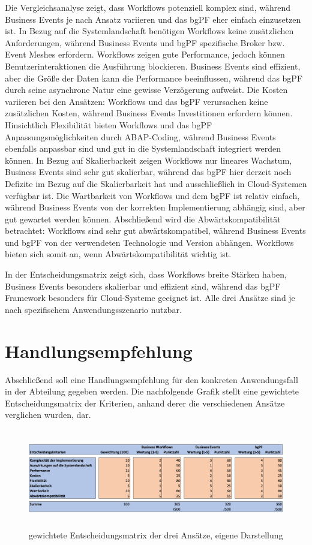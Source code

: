 Die Vergleichsanalyse zeigt, dass Workflows potenziell komplex sind, während Business Events je nach Ansatz variieren und das bgPF eher einfach einzusetzen ist. In Bezug auf die Systemlandschaft benötigen Workflows keine zusätzlichen Anforderungen, während Business Events und bgPF spezifische Broker bzw. Event Meshes erfordern. Workflows zeigen gute Performance, jedoch können Benutzerinteraktionen die Ausführung blockieren. Business Events sind effizient, aber die Grö{\ss}e der Daten kann die Performance beeinflussen, während das bgPF durch seine asynchrone Natur eine gewisse Verzögerung aufweist. Die Kosten variieren bei den Ansätzen: Workflows und das bgPF verursachen keine zusätzlichen Kosten, während Business Events Investitionen erfordern können. Hinsichtlich Flexibilität bieten Workflows und das bgPF Anpassungsmöglichkeiten durch ABAP-Coding, während Business Events ebenfalls anpassbar sind und gut in die Systemlandschaft integriert werden können. In Bezug auf Skalierbarkeit zeigen Workflows nur lineares Wachstum, Business Events sind sehr gut skalierbar, während das bgPF hier derzeit noch Defizite im Bezug auf die Skalierbarkeit hat und ausschlie{\ss}lich in Cloud-Systemen verfügbar ist. Die Wartbarkeit von Workflows und dem bgPF ist relativ einfach, während Business Events von der korrekten Implementierung abhängig sind, aber gut gewartet werden können. Abschlie{\ss}end wird die Abwärtskompatibilität betrachtet: Workflows sind sehr gut abwärtskompatibel, während Business Events und bgPF von der verwendeten Technologie und Version abhängen. Workflows bieten sich somit an, wenn Abwärtskompatibilität wichtig ist.

In der Entscheidungsmatrix zeigt sich, dass Workflows breite Stärken haben, Business Events besonders skalierbar und effizient sind, während das bgPF Framework besonders für Cloud-Systeme geeignet ist. Alle drei Ansätze sind je nach spezifischem Anwendungsszenario nutzbar.

\section{Handlungsempfehlung}

Abschlie{\ss}end soll eine Handlungsempfehlung für den konkreten Anwendungsfall in der Abteilung gegeben werden. Die nachfolgende Grafik stellt eine gewichtete Entscheidungsmatrix der Kriterien, anhand derer die verschiedenen Ansätze verglichen wurden, dar.

\begin{figure}[H]
 \centering
 \includegraphics[height=4.3cm]{Bilder/Handlungsempfehlung_Entscheidungsmatrix.png}
 \caption[gewichtete Entscheidungsmatrix der drei Ansätze]{gewichtete Entscheidungsmatrix der drei Ansätze, eigene Darstellung}
 \label{fig:iso_norm}
\end{figure}

